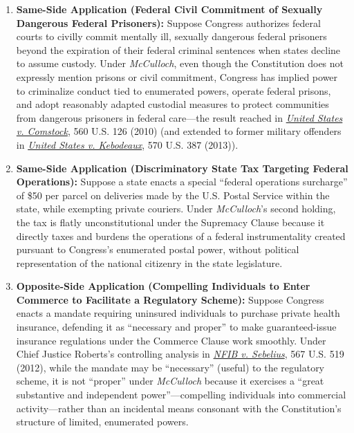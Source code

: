 \documentclass[12pt]{article}
\begin{document}
\begin{enumerate}
    \item \textbf{Same-Side Application (Federal Civil Commitment of Sexually Dangerous Federal Prisoners):} Suppose Congress authorizes federal courts to civilly commit mentally ill, sexually dangerous federal prisoners beyond the expiration of their federal criminal sentences when states decline to assume custody. Under \textit{McCulloch}, even though the Constitution does not expressly mention prisons or civil commitment, Congress has implied power to criminalize conduct tied to enumerated powers, operate federal prisons, and adopt reasonably adapted custodial measures to protect communities from dangerous prisoners in federal care---the result reached in \textit{\href{https://supreme.justia.com/cases/federal/us/560/126/}{United States v. Comstock}}, 560 U.S. 126 (2010) (and extended to former military offenders in \textit{\href{https://supreme.justia.com/cases/federal/us/570/387/}{United States v. Kebodeaux}}, 570 U.S. 387 (2013)).

    \item \textbf{Same-Side Application (Discriminatory State Tax Targeting Federal Operations):} Suppose a state enacts a special ``federal operations surcharge'' of \$50 per parcel on deliveries made by the U.S. Postal Service within the state, while exempting private couriers. Under \textit{McCulloch}'s second holding, the tax is flatly unconstitutional under the Supremacy Clause because it directly taxes and burdens the operations of a federal instrumentality created pursuant to Congress's enumerated postal power, without political representation of the national citizenry in the state legislature.

    \item \textbf{Opposite-Side Application (Compelling Individuals to Enter Commerce to Facilitate a Regulatory Scheme):} Suppose Congress enacts a mandate requiring uninsured individuals to purchase private health insurance, defending it as ``necessary and proper'' to make guaranteed-issue insurance regulations under the Commerce Clause work smoothly. Under Chief Justice Roberts's controlling analysis in \textit{\href{https://supreme.justia.com/cases/federal/us/567/11-393/case.pdf}{NFIB v. Sebelius}}, 567 U.S. 519 (2012), while the mandate may be ``necessary'' (useful) to the regulatory scheme, it is not ``proper'' under \textit{McCulloch} because it exercises a ``great substantive and independent power''---compelling individuals into commercial activity---rather than an incidental means consonant with the Constitution's structure of limited, enumerated powers.


\end{enumerate}
\end{document}
